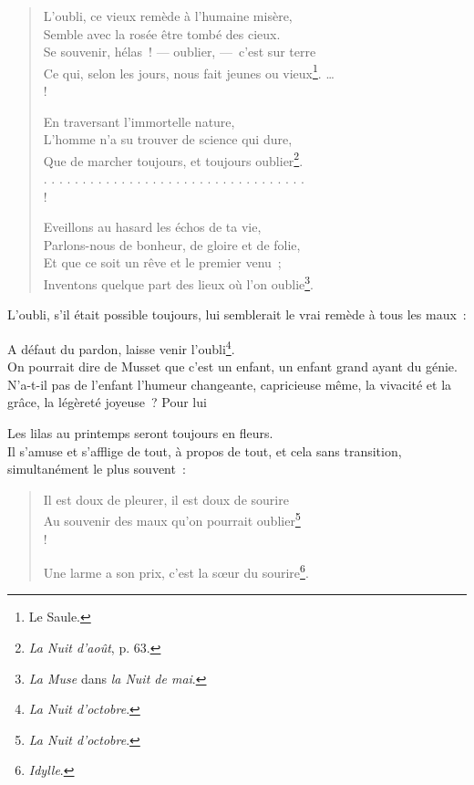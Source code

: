 \documentclass[french,twoside]{book} %
\begin{document}
\begin{verse}
L’oubli, ce vieux remède à l’humaine misère,\\
Semble avec la rosée être tombé des cieux.\\
Se souvenir, hélas ! — oublier, — c’est sur terre\\
Ce qui, selon les jours, nous fait jeunes ou vieux\footnote{Le Saule.}. …\\!

En traversant l’immortelle nature,\\
L’homme n’a su trouver de science qui dure,\\
Que de marcher toujours, et toujours oublier\footnote{\emph{La Nuit d’août}, p. 63.}.\\
. . . . . . . . . . . . . . . . . . . . . . . . . . . . . . . . . .\\!

Eveillons au hasard les échos de ta vie,\\
Parlons-nous de bonheur, de gloire et de folie,\\
Et que ce soit un rêve et le premier venu ;\\
Inventons quelque part des lieux où l’on oublie\footnote{\emph{La Muse} dans \emph{la Nuit de mai}.}.\\
\end{verse}

\noindent L’oubli, s’il était possible toujours, lui semblerait le vrai remède à tous les maux :\par

A défaut du pardon, laisse venir l’oubli\footnote{\emph{La Nuit d’octobre}.}.\\

\noindent On pourrait dire de Musset que c’est un enfant, un enfant grand ayant du génie. N’a-t-il pas de l’enfant l’humeur changeante, capricieuse même, la vivacité et la grâce, la légèreté joyeuse ? Pour lui\par

Les lilas au printemps seront toujours en fleurs.\\

\noindent Il s’amuse et s’afflige de tout, à propos de tout, et cela sans transition, simultanément le plus souvent :\par


\begin{verse}
Il est doux de pleurer, il est doux de sourire\\
Au souvenir des maux qu’on pourrait oublier\footnote{\emph{La Nuit d’octobre}.}\\!

Une larme a son prix, c’est la sœur du sourire\footnote{\emph{Idylle}.}.\\
\end{verse}
\end{document}

